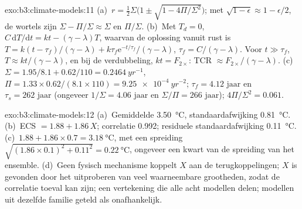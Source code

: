 \begin{solution}{exo:b3:climate-models:11}
(a)~$r = \tfrac12\Sigma\big(1 \pm \sqrt{1 - 4\Pi/\Sigma^2}\big)$; met
$\sqrt{1 - \epsilon} \approx 1 - \epsilon/2$, de wortels zijn $\Sigma -
\Pi/\Sigma \approx \Sigma$ en $\Pi/\Sigma$. (b)~Met $T_d = 0$, $C\,\mathrm
dT/\mathrm dt = kt - (\gamma - \lambda)T$, waarvan de oplossing vanuit rust is $T =
k(t - \tau_f)/(\gamma - \lambda) + k\tau_f\mathrm e^{-t/\tau_f}/(\gamma -
\lambda)$, $\tau_f = C/(\gamma - \lambda)$. Voor $t \gg \tau_f$, $T \approx
kt/(\gamma - \lambda)$, en bij de verdubbeling, $kt = F_{2\times}$: TCR
$\approx F_{2\times}/(\gamma - \lambda)$. (c)~$\Sigma = 1.95/8.1 +
0.62/110 = \qty{0.2464}{yr^{-1}}$, $\Pi = 1.33\times0.62/(8.1\times110) =
\qty{9.25e-4}{yr^{-2}}$; $\tau_f = \num{4.12}\text{ jaar}$ en $\tau_s =
\num{262}\text{ jaar}$ (ongeveer $1/\Sigma = \num{4.06}\text{ jaar}$ en
$\Sigma/\Pi = \num{266}\text{ jaar}$); $4\Pi/\Sigma^2 = 0.061$.
\end{solution}

\begin{solution}{exo:b3:climate-models:12}
\sloppy (a)~Gemiddelde \qty{3.50}{\celsius}, standaardafwijking \qty{0.81}{\celsius}.
(b)~ECS $= 1.88 + 1.86\,X$; correlatie \num{0.992}; residuele
standaardafwijking \qty{0.11}{\celsius}. (c)~$1.88 + 1.86\times0.7 =
\qty{3.18}{\celsius}$, met een spreiding $\sqrt{(1.86\times0.1)^2 + 0.11^2} =
\qty{0.22}{\celsius}$, ongeveer een kwart van de spreiding van het ensemble.
(d)~Geen fysisch mechanisme koppelt $X$ aan de terugkoppelingen; $X$ is gevonden door
het uitproberen van veel waarneembare grootheden, zodat de correlatie toeval kan zijn; een vertekening
die alle acht modellen delen; modellen uit dezelfde familie geteld als
onafhankelijk.\par
\end{solution}

